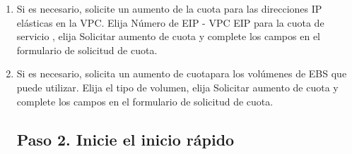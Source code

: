 \documentclass[12pt,letterpaper]{article}
\begin{document}
\begin{enumerate}
	    \item Si es necesario, solicite un aumento de la cuota para las direcciones IP elásticas en la VPC. Elija Número de EIP - VPC EIP para la cuota de servicio , elija Solicitar aumento de cuota y complete los campos en el formulario de solicitud de cuota.
	    \item Si es necesario, solicita un aumento de cuotapara los volúmenes de EBS que puede utilizar. Elija el tipo de volumen, elija Solicitar aumento de cuota y complete los campos en el formulario de solicitud de cuota.
	    
	    
\subsection{Paso 2. Inicie el inicio rápido }
		
	\begin{enumerate}
		

\end{enumerate}
\end{enumerate}
\end{document}
